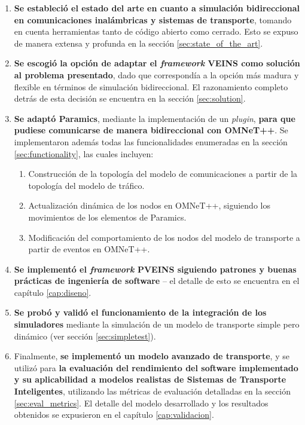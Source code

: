 \begin{enumerate}
    \item \textbf{Se estableció el estado del arte en cuanto a simulación bidireccional en comunicaciones inalámbricas y sistemas de transporte}, tomando en cuenta herramientas tanto de código abierto como cerrado. Esto se expuso de manera extensa y profunda en la sección \ref{sec:state_of_the_art}.
    
    \item \textbf{Se escogió la opción de adaptar el \emph{framework} VEINS como solución al problema presentado}, dado que correspondía a la opción más madura y flexible en términos de simulación bidireccional. El razonamiento completo detrás de esta decisión se encuentra en la sección \ref{sec:solution}.
    
    \item \textbf{Se adaptó Paramics}, mediante la implementación de un \emph{plugin}, \textbf{para que pudiese comunicarse de manera bidireccional con OMNeT++}. Se implementaron además todas las funcionalidades enumeradas en la sección \ref{sec:functionality}, las cuales incluyen:
    \begin{enumerate}
        
        \item Construcción de la topología del modelo de comunicaciones a partir de la topología del modelo de tráfico.
        
        \item Actualización dinámica de los nodos en OMNeT++, siguiendo los movimientos de los elementos de Paramics.
        \item Modificación del comportamiento de los nodos del modelo de transporte a partir de eventos en OMNeT++.
    \end{enumerate}
    \item \textbf{Se implementó el \emph{framework} PVEINS siguiendo patrones y buenas prácticas de ingeniería de software} -- el detalle de esto se encuentra en el capítulo \ref{cap:diseno}.
    
    \item \textbf{Se probó y validó el funcionamiento de la integración de los simuladores} mediante la simulación de un modelo de transporte simple pero dinámico (ver sección \ref{sec:simpletest}).
    
    \item Finalmente, \textbf{se implementó un modelo avanzado de transporte}, y se utilizó para \textbf{la evaluación del rendimiento del software implementado y su aplicabilidad a modelos realistas de Sistemas de Transporte Inteligentes}, utilizando las métricas de evaluación detalladas en la sección \ref{sec:eval_metrics}. El detalle del modelo desarrollado y los resultados obtenidos se expusieron en el capítulo \ref{cap:validacion}.
\end{enumerate}